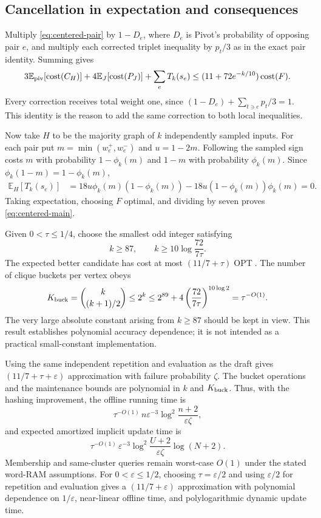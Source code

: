 \documentclass[11pt]{article}
\begin{document}
\subsection{Cancellation in expectation and consequences}

Multiply \eqref{eq:centered-pair} by $1-D_e$, where $D_e$ is Pivot's
probability of opposing pair $e$, and multiply each corrected triplet
inequality by $p_t/3$ as in the exact pair identity. Summing gives
\[
 3\mathbb E_{\rm piv}[\operatorname{cost}(C_H)]
 +4\mathbb E_J[\operatorname{cost}(P_J)]
 +\sum_e T_k(s_e)
 \le(11+72e^{-k/10})\operatorname{cost}(F).
\]
Every correction receives total weight one, since
$(1-D_e)+\sum_{t\ni e}p_t/3=1$. This identity is the reason to add
the same correction to both local inequalities.

Now take $H$ to be the majority graph of $k$ independently sampled
inputs. For each pair put $m=\min(w_e^+,w_e^-)$ and $u=1-2m$.
Following the sampled sign costs $m$ with probability $1-\phi_k(m)$
and $1-m$ with probability $\phi_k(m)$. Since
$\phi_k(1-m)=1-\phi_k(m)$,
\begin{align*}
 \mathbb E_H[T_k(s_e)]
 &=18u\phi_k(m)(1-\phi_k(m))
   -18u(1-\phi_k(m))\phi_k(m)=0.
\end{align*}
Taking expectation, choosing $F$ optimal, and dividing by seven proves
\eqref{eq:centered-main}.

Given $0<\tau\le1/4$, choose the smallest odd integer satisfying
\[
 k\ge87,\qquad k\ge10\log\frac{72}{7\tau}.
\]
The expected better candidate has cost at most $(11/7+\tau)\operatorname{OPT}$.
The number of clique buckets per vertex obeys
\[
 K_{\rm buck}=\binom{k}{(k+1)/2}\le2^k
 \le 2^{89}+4\left(\frac{72}{7\tau}\right)^{10\log 2}
 =\tau^{-O(1)}.
\]
The very large absolute constant arising from $k\ge87$ should be
kept in view. This result establishes polynomial accuracy dependence;
it is not intended as a practical small-constant implementation.

Using the same independent repetition and evaluation as the draft gives
$(11/7+\tau+\varepsilon)$ approximation with failure probability
$\zeta$. The bucket operations and the maintenance bounds are polynomial
in $k$ and $K_{\rm buck}$. Thus, with the hashing improvement, the offline
running time is
\[
 \tau^{-O(1)}\,n\varepsilon^{-3}
       \log^2\frac{n+2}{\varepsilon\zeta},
\]
and expected amortized implicit update time is
\[
 \tau^{-O(1)}\,\varepsilon^{-3}
       \log^2\frac{U+2}{\varepsilon\zeta}\log(N+2).
\]
Membership and same-cluster queries remain worst-case $O(1)$ under the
stated word-RAM assumptions. For $0<\varepsilon\le1/2$, choosing $\tau=\varepsilon/2$ and using
$\varepsilon/2$ for repetition and evaluation gives a
$(11/7+\varepsilon)$ approximation with polynomial dependence on
$1/\varepsilon$, near-linear offline time, and polylogarithmic dynamic
update time.
\end{document}
